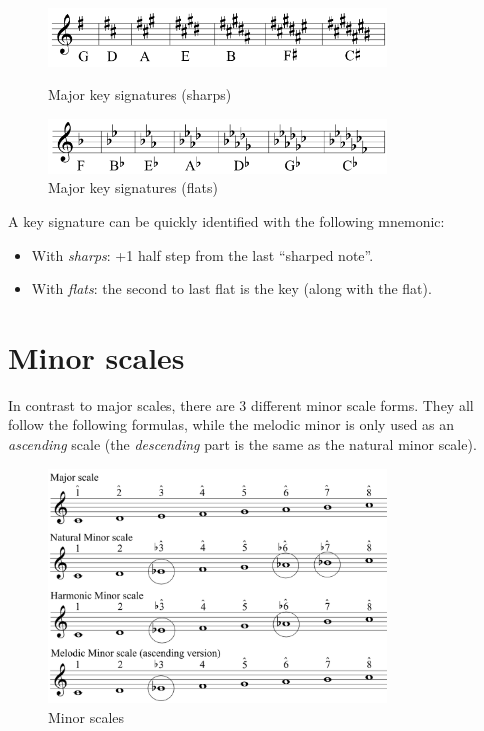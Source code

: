 \begin{figure}[h]
    \begin{center}
        \includegraphics[width=0.8\textwidth]{img/majorsharp}
        \caption{Major key signatures (sharps)}
        \includegraphics[width=0.8\textwidth]{img/majorflat}
        \caption{Major key signatures (flats)}
    \end{center}
\end{figure}
A key signature can be quickly identified with the following mnemonic:
\begin{itemize}
    \item With \emph{sharps}: +1 half step from the last ``sharped note''.
    \item With \emph{flats}: the second to last flat is the key (along with the flat).
\end{itemize}

\section{Minor scales}
In contrast to major scales, there are 3 different minor scale forms. They all follow the following formulas, while the melodic minor is only used as an \emph{ascending} scale (the \emph{descending} part is the same as the natural minor scale).
\begin{figure}
    \begin{center}
        \includegraphics[width=0.8\textwidth]{img/minorscales}
        \caption{Minor scales}
    \end{center}
\end{figure}

